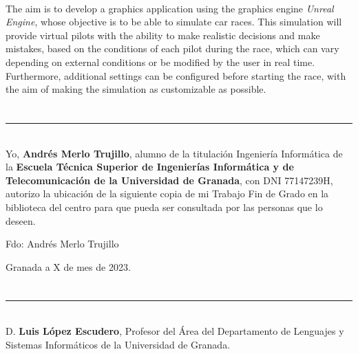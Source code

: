 \vspace{0.7cm}
\\

The aim is to develop a graphics application using the graphics engine \textit{Unreal Engine}, whose objective is to be able to simulate car races. This simulation will provide virtual pilots with the ability to make realistic decisions and make mistakes, based on the conditions of each pilot during the race, which can vary depending on external conditions or be modified by the user in real time. Furthermore, additional settings can be configured before starting the race, with the aim of making the simulation as customizable as possible.

\chapter*{}
\thispagestyle{empty}

\noindent\rule[-1ex]{\textwidth}{2pt}\\[4.5ex]

Yo, \textbf{Andrés Merlo Trujillo}, alumno de la titulación Ingeniería Informática de la \textbf{Escuela Técnica Superior
de Ingenierías Informática y de Telecomunicación de la Universidad de Granada}, con DNI 77147239H, autorizo la
ubicación de la siguiente copia de mi Trabajo Fin de Grado en la biblioteca del centro para que pueda ser
consultada por las personas que lo deseen.

\vspace{6cm}

\noindent Fdo: Andrés Merlo Trujillo

\vspace{2cm}

\begin{flushright}
Granada a X de mes de 2023.
\end{flushright}


\chapter*{}
\thispagestyle{empty}

\noindent\rule[-1ex]{\textwidth}{2pt}\\[4.5ex]

D. \textbf{Luis López Escudero}, Profesor del Área del Departamento de Lenguajes y Sistemas Informáticos de la Universidad de Granada.


